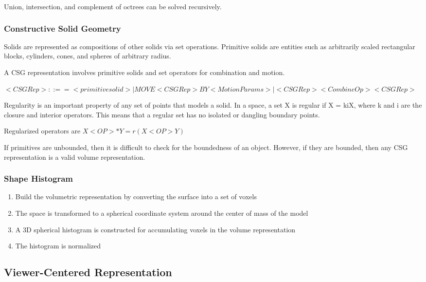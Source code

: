 \documentclass{article}
\begin{document}
\begin{multicols}{2}
Union, intersection, and complement of octrees can be solved recursively.

\subsubsection{Constructive Solid Geometry}

Solids are represented as compositions of other solids via set operations. Primitive solids are entities such as arbitrarily scaled rectangular blocks, cylinders, cones, and spheres of arbitrary radius.

A CSG representation involves primitive solids and set operators for combination and motion.

$<CSG Rep> ::== <primitive solid> | MOVE <CSG Rep> BY <Motion Params> | <CSG Rep> <Combine Op> <CSG Rep>$

Regularity is an important property of any set of points that models a solid. In a space, a set X is regular if X = kiX, where k and i are the closure and interior operators. This means that a regular set has no isolated or dangling boundary points.

Regularized operators are
$X <OP> * Y =  r(X <OP> Y)$

If primitives are unbounded, then it is difficult to check for the boundedness of an object. However, if they are bounded, then any CSG representation is a valid volume representation.

\subsubsection{Shape Histogram}

\begin{enumerate}
  \item {Build the volumetric representation by converting the surface into a set of voxels}
  \item {The space is transformed to a spherical coordinate system around the center of mass of the model}
  \item {A 3D spherical histogram is constructed for accumulating voxels in the volume representation}
  \item {The histogram is normalized}
\end{enumerate}

\subsection{Viewer-Centered Representation}


\end{multicols}
\end{document}
